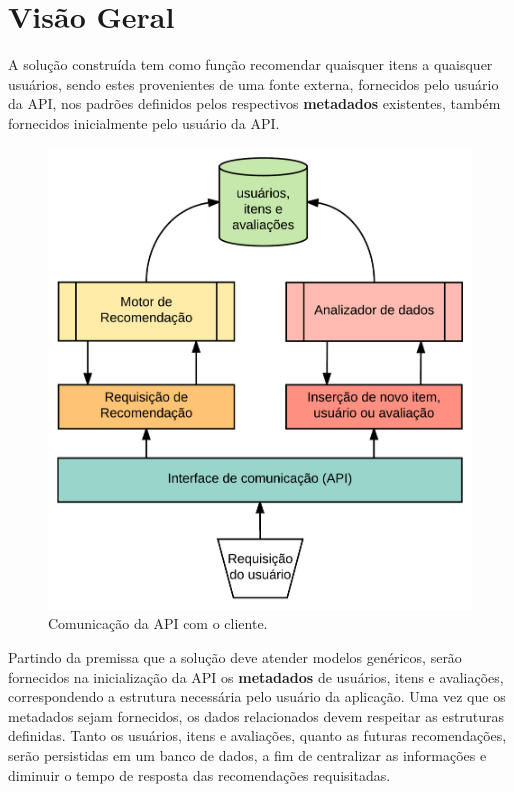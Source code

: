 \documentclass[12pt, openright, oneside, a4paper, brazil]{abntex2}
\begin{document}
\section{Visão Geral} \label{visao_geral}

A solução construída tem como função recomendar quaisquer itens a quaisquer usuários, sendo estes provenientes de uma fonte externa, fornecidos pelo usuário da API, nos padrões definidos pelos respectivos \textbf{metadados} existentes, também fornecidos inicialmente pelo usuário da API.

\begin{figure}[htp]
	
	\caption{\label{interconnection}Comunicação da API com o cliente.}

	\begin{center}
		\includegraphics[scale=0.6]{images/MORPY_overview.png}
	\end{center}

	\hspace{5.5cm}{Fonte: O Autor.}

\end{figure}


Partindo da premissa que a solução deve atender modelos genéricos, serão fornecidos na inicialização da API os \textbf{metadados} de usuários, itens e avaliações, correspondendo a estrutura necessária pelo usuário da aplicação. Uma vez que os metadados sejam fornecidos, os dados relacionados devem respeitar as estruturas definidas. Tanto os usuários, itens e avaliações, quanto as futuras recomendações, serão persistidas em um banco de dados, a fim de centralizar as informações e diminuir o tempo de resposta das recomendações requisitadas.
\end{document}
